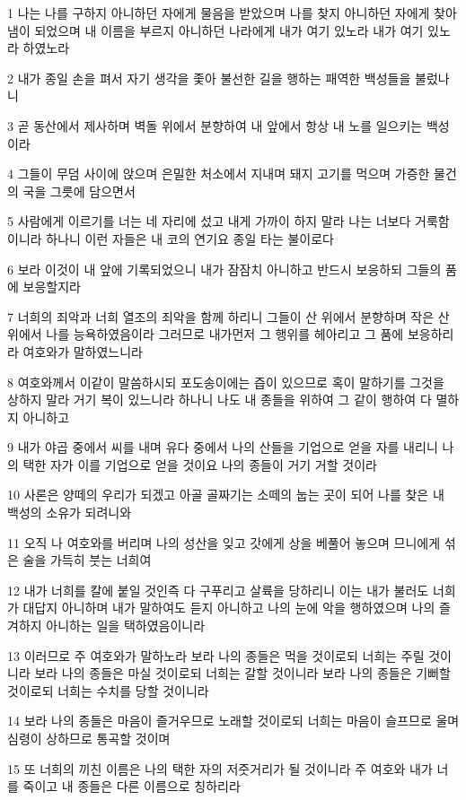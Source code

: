\par 1 나는 나를 구하지 아니하던 자에게 물음을 받았으며 나를 찾지 아니하던 자에게 찾아냄이 되었으며 내 이름을 부르지 아니하던 나라에게 내가 여기 있노라 내가 여기 있노라 하였노라
\par 2 내가 종일 손을 펴서 자기 생각을 좇아 불선한 길을 행하는 패역한 백성들을 불렀나니
\par 3 곧 동산에서 제사하며 벽돌 위에서 분향하여 내 앞에서 항상 내 노를 일으키는 백성이라
\par 4 그들이 무덤 사이에 앉으며 은밀한 처소에서 지내며 돼지 고기를 먹으며 가증한 물건의 국을 그릇에 담으면서
\par 5 사람에게 이르기를 너는 네 자리에 섰고 내게 가까이 하지 말라 나는 너보다 거룩함이니라 하나니 이런 자들은 내 코의 연기요 종일 타는 불이로다
\par 6 보라 이것이 내 앞에 기록되었으니 내가 잠잠치 아니하고 반드시 보응하되 그들의 품에 보응할지라
\par 7 너희의 죄악과 너희 열조의 죄악을 함께 하리니 그들이 산 위에서 분향하며 작은 산 위에서 나를 능욕하였음이라 그러므로 내가먼저 그 행위를 헤아리고 그 품에 보응하리라 여호와가 말하였느니라
\par 8 여호와께서 이같이 말씀하시되 포도송이에는 즙이 있으므로 혹이 말하기를 그것을 상하지 말라 거기 복이 있느니라 하나니 나도 내 종들을 위하여 그 같이 행하여 다 멸하지 아니하고
\par 9 내가 야곱 중에서 씨를 내며 유다 중에서 나의 산들을 기업으로 얻을 자를 내리니 나의 택한 자가 이를 기업으로 얻을 것이요 나의 종들이 거기 거할 것이라
\par 10 사론은 양떼의 우리가 되겠고 아골 골짜기는 소떼의 눕는 곳이 되어 나를 찾은 내 백성의 소유가 되려니와
\par 11 오직 나 여호와를 버리며 나의 성산을 잊고 갓에게 상을 베풀어 놓으며 므니에게 섞은 술을 가득히 붓는 너희여
\par 12 내가 너희를 칼에 붙일 것인즉 다 구푸리고 살륙을 당하리니 이는 내가 불러도 너희가 대답지 아니하며 내가 말하여도 듣지 아니하고 나의 눈에 악을 행하였으며 나의 즐겨하지 아니하는 일을 택하였음이니라
\par 13 이러므로 주 여호와가 말하노라 보라 나의 종들은 먹을 것이로되 너희는 주릴 것이니라 보라 나의 종들은 마실 것이로되 너희는 갈할 것이니라 보라 나의 종들은 기뻐할 것이로되 너희는 수치를 당할 것이니라
\par 14 보라 나의 종들은 마음이 즐거우므로 노래할 것이로되 너희는 마음이 슬프므로 울며 심령이 상하므로 통곡할 것이며
\par 15 또 너희의 끼친 이름은 나의 택한 자의 저줏거리가 될 것이니라 주 여호와 내가 너를 죽이고 내 종들은 다른 이름으로 칭하리라
